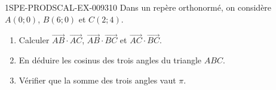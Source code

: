 \begin{exercice}{1SPE-PRODSCAL-EX-009}{3}{10}
Dans un repère orthonormé, on considère $A(0; 0)$, $B(6; 0)$ et $C(2; 4)$.
\begin{enumerate}
  \item Calculer $\overrightarrow{AB} \cdot \overrightarrow{AC}$, $\overrightarrow{AB} \cdot \overrightarrow{BC}$ et $\overrightarrow{AC} \cdot \overrightarrow{BC}$.
  \item En déduire les cosinus des trois angles du triangle $ABC$.
  \item Vérifier que la somme des trois angles vaut $\pi$.
\end{enumerate}
\end{exercice}
